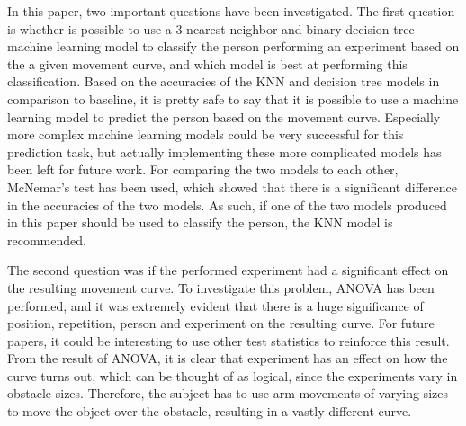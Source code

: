 \documentclass[11pt, fleqn, titlepage]{article}
\begin{document}
In this paper, two important questions have been investigated. The first question is whether is possible to use a 3-nearest neighbor and binary decision tree machine learning model to classify the person performing an experiment based on the a given movement curve, and which model is best at performing this classification. Based on the accuracies of the KNN and decision tree models in comparison to baseline, it is pretty safe to say that it is possible to use a machine learning model to predict the person based on the movement curve. Especially more complex machine learning models could be very successful for this prediction task, but actually implementing these more complicated models has been left for future work. For comparing the two models to each other, McNemar's test has been used, which showed that there is a significant difference in the accuracies of the two models. As such, if one of the two models produced in this paper should be used to classify the person, the KNN model is recommended.

The second question was if the performed experiment had a significant effect on the resulting movement curve. To investigate this problem, ANOVA has been performed, and it was extremely evident that there is a huge significance of position, repetition, person and experiment on the resulting curve. For future papers, it could be interesting to use other test statistics to reinforce this result. From the result of ANOVA, it is clear that experiment has an effect on how the curve turns out, which can be thought of as logical, since the experiments vary in obstacle sizes. Therefore, the subject has to use arm movements of varying sizes to move the object over the obstacle, resulting in a vastly different curve.
\newpage


\end{document}
